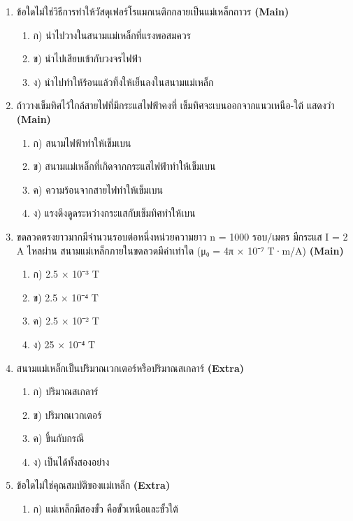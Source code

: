 \documentclass[12pt]{article}
\begin{document}
\begin{enumerate}[label=\arabic*.]
\begin{enumerate}[label=)]
\item ค) ลดลงเป็น 1/4 เท่า
\item ง) ไม่เปลี่ยนแปลง
\end{enumerate}
\item ข้อใดไม่ใช่วิธีการทำให้วัสดุเฟอร์โรแมกเนติกกลายเป็นแม่เหล็กถาวร \hfill \textbf{\small (Main)}
\begin{enumerate}[label=)]
\item ก) นำไปวางในสนามแม่เหล็กที่แรงพอสมควร
\item ข) นำไปเสียบเข้ากับวงจรไฟฟ้า
\item ง) นำไปทำให้ร้อนแล้วทิ้งให้เย็นลงในสนามแม่เหล็ก
\end{enumerate}
\item ถ้าวางเข็มทิศไว้ใกล้สายไฟที่มีกระแสไฟฟ้าคงที่ เข็มทิศจะเบนออกจากแนวเหนือ-ใต้ แสดงว่า \hfill \textbf{\small (Main)}
\begin{enumerate}[label=)]
\item ก) สนามไฟฟ้าทำให้เข็มเบน
\item ข) สนามแม่เหล็กที่เกิดจากกระแสไฟฟ้าทำให้เข็มเบน
\item ค) ความร้อนจากสายไฟทำให้เข็มเบน
\item ง) แรงดึงดูดระหว่างกระแสกับเข็มทิศทำให้เบน
\end{enumerate}
\item ขดลวดตรงยาวมากมีจำนวนรอบต่อหนึ่งหน่วยความยาว n = 1000 รอบ/เมตร มีกระแส I = 2 A ไหลผ่าน สนามแม่เหล็กภายในขดลวดมีค่าเท่าใด (μ₀ = 4π × 10⁻⁷ T·m/A) \hfill \textbf{\small (Main)}
\begin{enumerate}[label=)]
\item ก) 2.5 × 10⁻³ T
\item ข) 2.5 × 10⁻⁴ T
\item ค) 2.5 × 10⁻² T
\item ง) 25 × 10⁻⁴ T
\end{enumerate}
\item สนามแม่เหล็กเป็นปริมาณเวกเตอร์หรือปริมาณสเกลาร์ \hfill \textbf{\small (Extra)}
\begin{enumerate}[label=)]
\item ก) ปริมาณสเกลาร์
\item ข) ปริมาณเวกเตอร์
\item ค) ขึ้นกับกรณี
\item ง) เป็นได้ทั้งสองอย่าง
\end{enumerate}
\item ข้อใดไม่ใช่คุณสมบัติของแม่เหล็ก \hfill \textbf{\small (Extra)}
\begin{enumerate}[label=)]
\item ก) แม่เหล็กมีสองขั้ว คือขั้วเหนือและขั้วใต้

\end{enumerate}
\end{enumerate}
\end{document}
